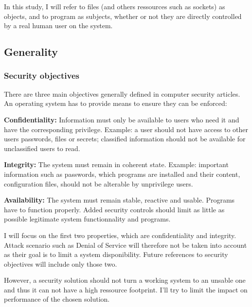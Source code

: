 \documentclass[pdftex,a4paper,titlepage,11pt]{article}
\begin{document}
\bigskip

In this study, I will refer to files (and others ressources such as sockets) as
objects, and to program as subjects, whether or not they are directly controlled
by a real human user on the system.

\subsection{Generality}

\subsubsection{Security objectives}

There are three main objectives generally defined in computer security articles.
An operating system has to provide means to ensure they can be enforced:

\bigskip

\textbf{Confidentiality:}
Information must only be available to users who need it and have the
corresponding privilege. Example: a user should not have access to other users
passwords, files or secrets; classified information should not be available for
unclassified users to read.

\medskip

\textbf{Integrity:}
The system must remain in coherent state. Example: important information such
as passwords, which programs are installed and their content, configuration
files, should not be alterable by unprivilege users.

\medskip

\textbf{Availability:}
The system must remain stable, reactive and usable. Programs have to function
properly. Added security controls should limit as little as possible legitimate
system functionnality and programs.

\bigskip

I will focus on the first two properties, which are confidentiality and
integrity. Attack scenario such as Denial of Service will therefore not be taken
into account as their goal is to limit a system disponibility. Future references
to security objectives will include only those two.

\bigskip

However, a security solution should not turn a working system to an unsable one
and thus it can not have a high ressource footprint. I'll try to limit the
impact on performance of the chosen solution.
\end{document}
